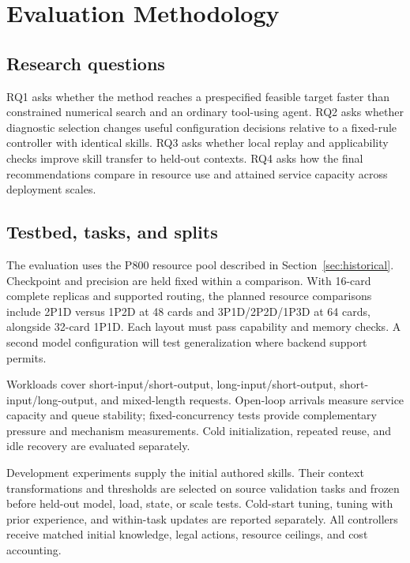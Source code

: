 \documentclass[11pt,a4paper]{article}
\begin{document}
\section{Evaluation Methodology}
\subsection{Research questions}
RQ1 asks whether the method reaches a prespecified feasible target faster than constrained numerical search and an ordinary tool-using agent. RQ2 asks whether diagnostic selection changes useful configuration decisions relative to a fixed-rule controller with identical skills. RQ3 asks whether local replay and applicability checks improve skill transfer to held-out contexts. RQ4 asks how the final recommendations compare in resource use and attained service capacity across deployment scales.

\subsection{Testbed, tasks, and splits}
The evaluation uses the P800 resource pool described in Section~\ref{sec:historical}. Checkpoint and precision are held fixed within a comparison. With 16-card complete replicas and supported routing, the planned resource comparisons include 2P1D versus 1P2D at 48 cards and 3P1D/2P2D/1P3D at 64 cards, alongside 32-card 1P1D. Each layout must pass capability and memory checks. A second model configuration will test generalization where backend support permits.

Workloads cover short-input/short-output, long-input/short-output, short-input/long-output, and mixed-length requests. Open-loop arrivals measure service capacity and queue stability; fixed-concurrency tests provide complementary pressure and mechanism measurements. Cold initialization, repeated reuse, and idle recovery are evaluated separately.

Development experiments supply the initial authored skills. Their context transformations and thresholds are selected on source validation tasks and frozen before held-out model, load, state, or scale tests. Cold-start tuning, tuning with prior experience, and within-task updates are reported separately. All controllers receive matched initial knowledge, legal actions, resource ceilings, and cost accounting.
\end{document}
